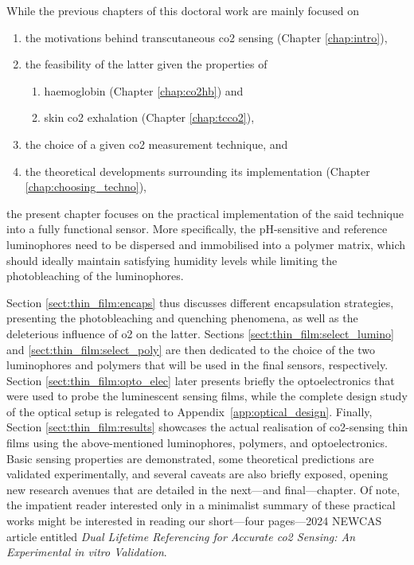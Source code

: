 While the previous chapters of this doctoral work are mainly focused on
\begin{enumerate}
	\item the motivations behind transcutaneous \gls{co2} sensing (Chapter \ref{chap:intro}),
	\item the feasibility of the latter given the properties of
	\begin{enumerate}[label=(\alph*)]
		\item haemoglobin (Chapter \ref{chap:co2hb}) and
		\item skin \gls{co2} exhalation (Chapter \ref{chap:tcco2}),
	\end{enumerate}
	\item the choice of a given \gls{co2} measurement technique, and
	\item the theoretical developments surrounding its implementation (Chapter \ref{chap:choosing_techno}),
\end{enumerate}
the present chapter focuses on the practical implementation of the said technique into a fully functional sensor. More specifically, the pH-sensitive and reference luminophores need to be dispersed and immobilised into a polymer matrix, which should ideally maintain satisfying humidity levels while limiting the photobleaching of the luminophores.

Section \ref{sect:thin_film:encaps} thus discusses different encapsulation strategies, presenting the photobleaching and quenching phenomena, as well as the deleterious influence of \gls{o2} on the latter. Sections \ref{sect:thin_film:select_lumino} and \ref{sect:thin_film:select_poly} are then dedicated to the choice of the two luminophores and polymers that will be used in the final sensors, respectively. Section \ref{sect:thin_film:opto_elec} later presents briefly the optoelectronics that were used to probe the luminescent sensing films, while the complete design study of the optical setup is relegated to Appendix~\ref{app:optical_design}. Finally, Section \ref{sect:thin_film:results} showcases the actual realisation of \gls{co2}-sensing thin films using the above-mentioned luminophores, polymers, and optoelectronics. Basic sensing properties are demonstrated, some theoretical predictions are validated experimentally, and several caveats are also briefly exposed, opening new research avenues that are detailed in the next---and final---chapter. Of note, the impatient reader interested only in a minimalist summary of these practical works might be interested in reading our short---four pages---2024 NEWCAS article entitled \textit{Dual Lifetime Referencing for Accurate \gls{co2} Sensing: An Experimental \textit{in vitro} Validation}\cite{dervieux2024newcas}.

